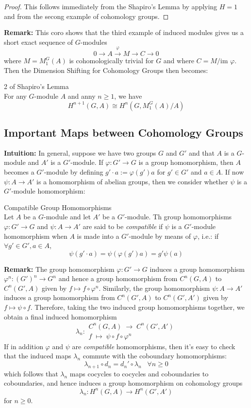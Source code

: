\begin{proof}
    This follows immediately from the Shapiro's Lemma by applying $H=1$ and from the secong example of cohomology groups.
\end{proof}

\noindent\textbf{Remark:} This coro shows that the third example of induced modules gives us a short exact sequence of $G$-modules
\[
0\to A\xrightarrow{\varphi} M\to C\to0
\]
where $M=M_1^G(A)$ is cohomologically trivial for $G$ and where $C=M/ \text{im }\varphi$. Then the Dimension Shifting for Cohomology Groups then becomes:

\begin{corollary}{2 of Shapiro's Lemma}\\
For any $G$-module $A$ and anny $n\geq 1$, we have
\[
H^{n+1} (G,A) \cong H^n(G,M_1^G(A)/A)
\]
\end{corollary}

\subsection{Important Maps between Cohomology Groups}

\noindent\textbf{Intuition:} In general, suppose we have two groups $G$ and $G'$ and that $A$ is a $G$-module and $A'$ is a $G'$-module. If $\varphi: G'\to G$ is a group homomorphism, then $A$ becomes a $G'$-module by defining $g'\cdot a:= \varphi(g')a$ for $g'\in G'$ and $a\in A$. If now $\psi:A\to A'$ is a homomorphism of abelian groups, then we consider whether $\psi$ is a $G'$-module homomorphism:

\begin{definition}{Compatible Group Homomorphisms}\\
Let $A$ be a $G$-module and let $A'$ be a $G'$-module. Th group homomorphisms $\varphi: G'\to G$ and $\psi:A\to A'$ are said to be \textit{compatible} if $\psi$ is a $G'$-module homomorphism when $A$ is made into a $G'$-module by means of $\varphi$, i.e.: if $\forall g'\in G',a\in A$,
\[
\psi(g'\cdot a)= \psi(\varphi(g')a)= g'\psi(a)
\]
\end{definition}

\noindent\textbf{Remark:} The group homomorphism $\varphi:G'\to G$ induces a group homomorphism $\varphi^n:(G')^n \to G^n$ and hence a group homomorphism from $C^n(G,A)$ to $C^n(G',A)$ given by $f\mapsto f\circ \varphi^n$. Similarly, the group homomorphism $\psi: A\to A'$ induces a group homomorphism from $C^n(G',A)$ to $C^n(G',A')$ given by $f \mapsto \psi\circ f$. Therefore, taking the two induced group homomorphisms together, we obtain a final induced homomorphism
\[
\lambda_n: \substack{C^n(G,A) \;\to\; C^n(G',A')\\
f \;\mapsto\; \psi\circ f\circ \varphi^n}
\]
If in addition $\varphi$ and $\psi$ are \textit{compatible} homomorphisms, then it's easy to check that the induced maps $\lambda_n$ commute with the coboundary homomorphisms:
\[
\lambda_{n+1} \circ d_n=d_n' \circ \lambda_n \;\;\;\forall n\geq 0
\]
which follows that $\lambda_n$ maps cocycles to cocycles and coboundaries to coboundaries, and hence induces a group homomorphism on cohomology groups
\[
\lambda_n:H^n(G,A) \to H^{n} (G',A')
\]
for $n\geq 0$.

